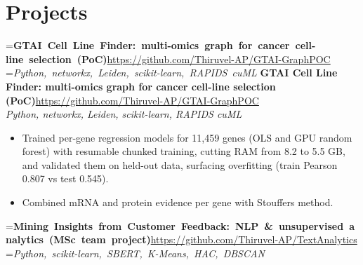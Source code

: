 \documentclass[a4paper,11pt]{article}
\newcommand{\project}[3]{%
  \textbf{#1}\hfill#3\\ {\color{muted}\small\textit{#2}}\par}
\newcommand{\gap}{\vspace{5pt}}
\begin{document}
\section{Projects}
=\hbox{\textbf{GTAI Cell Line Finder: multi-omics graph for cancer cell-line selection (PoC)}\hspace{1em}\url{https://github.com/Thiruvel-AP/GTAI-GraphPOC}}%
=\hbox{{\small\textit{Python, networkx, Leiden, scikit-learn, RAPIDS cuML}}}%
\ifdim\wd0>\linewidth
\ifdim\wd2>\linewidth
\textbf{GTAI Cell Line Finder: multi-omics graph for cancer cell-line selection (PoC)}\\ {\color{muted}\small\textit{Python, networkx, Leiden, scikit-learn, RAPIDS cuML}}\\ \hspace*{\fill}{\small\url{https://github.com/Thiruvel-AP/GTAI-GraphPOC}}\par
\else
\textbf{GTAI Cell Line Finder: multi-omics graph for cancer cell-line selection (PoC)}\\ {\color{muted}\small\textit{Python, networkx, Leiden, scikit-learn, RAPIDS cuML}}\hfill{\small\url{https://github.com/Thiruvel-AP/GTAI-GraphPOC}}\par
\fi
\else
\project{GTAI Cell Line Finder: multi-omics graph for cancer cell-line selection (PoC)}{Python, networkx, Leiden, scikit-learn, RAPIDS cuML}{\url{https://github.com/Thiruvel-AP/GTAI-GraphPOC}}
\fi
\begin{itemize}
  \item Trained per-gene regression models for 11,459 genes (OLS and GPU random forest) with resumable chunked training, cutting RAM from 8.2 to 5.5 GB, and validated them on held-out data, surfacing overfitting (train Pearson 0.807 vs test 0.545).
  \item Combined mRNA and protein evidence per gene with Stouffer\textquotesingle{}s method.
\end{itemize}
\gap
{}
=\hbox{\textbf{Mining Insights from Customer Feedback: NLP \& unsupervised analytics (MSc team project)}\hspace{1em}\url{https://github.com/Thiruvel-AP/TextAnalytics}}%
=\hbox{{\small\textit{Python, scikit-learn, SBERT, K-Means, HAC, DBSCAN}}}%
\end{document}
